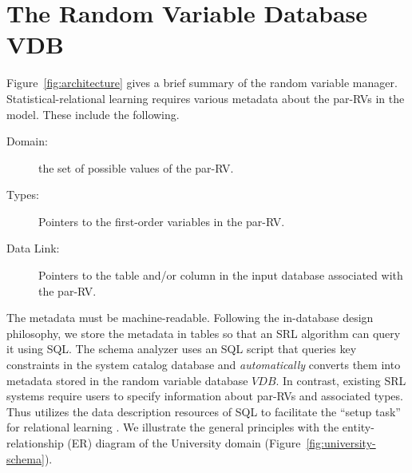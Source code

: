 \section{The Random Variable Database VDB} \label{sec:vdb}


%


Figure~\ref{fig:architecture} gives a brief summary of the random variable manager. Statistical-relational learning requires various metadata about the par-RVs in the model. These include the following. 

\begin{description}
\item[Domain:] the set of possible values of the par-RV.
\item[Types:] Pointers to the first-order variables
in the par-RV. 
\item[Data Link:] Pointers to the table and/or column in the input database associated with the par-RV. 
\end{description}
%
The metadata must be machine-readable. Following the in-database design philosophy, we store the metadata in tables so that an SRL algorithm can query it using SQL. The schema analyzer uses an SQL script that queries key constraints in the system catalog database and {\em automatically} converts them into metadata stored in the random variable database $VDB$. In contrast, existing SRL systems require users to specify information about par-RVs and associated types. 
Thus \FB utilizes the data description resources of SQL to facilitate the ``setup task'' for relational learning \cite{Walker2010}. We illustrate the general principles with the entity-relationship (ER) diagram of the University domain (Figure~\ref{fig:university-schema}). 



